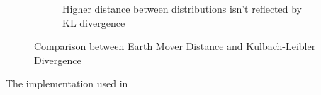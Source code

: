 \begin{figure}[ht]
\begin{subfigure}{.5\textwidth}
        \caption{Higher distance between distributions isn't reflected by KL divergence}
        \label{fig:LIFCode}
    \end{subfigure}
    \caption{Comparison between Earth Mover Distance and Kulbach-Leibler Divergence}
    \label{fig:LIFSingleSpikeGraphCode}
\end{figure}

The implementation used in 

\autocite{pele_fast_2009}
